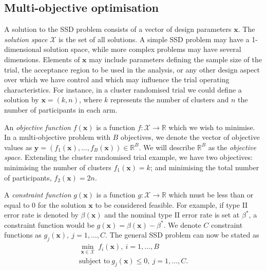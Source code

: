 \documentclass[sagev, Crown]{sagej}
\begin{document}
\subsection{Multi-objective optimisation}\label{sec:optimisation}

A solution to the SSD problem consists of a vector of design parameters $\mathbf{x}$. The \emph{solution space} $\mathcal{X}$ is the set of all solutions. A simple SSD problem may have a 1-dimensional solution space, while more complex problems may have several dimensions. Elements of $\mathbf{x}$ may include parameters defining the sample size of the trial, the acceptance region to be used in the analysis, or any other design aspect over which we have control and which may influence the trial operating characteristics. For instance, in a cluster randomised trial we could define a solution by $\mathbf{x} = (k, n)$, where $k$ represents the number of clusters and $n$ the number of participants in each arm.

An \emph{objective function} $f(\mathbf{x})$ is a function $f : \mathcal{X} \rightarrow \mathbb{R}$ which we wish to minimise. In a multi-objective problem with $B$ objectives, we denote the vector of objective values as $\mathbf{y} = (f_{1}(\mathbf{x}), \ldots, f_{B}(\mathbf{x})) \in \mathbb{R}^{B}$. We will describe $\mathbb{R}^{B}$ as the \emph{objective space}. Extending the cluster randomised trial example, we have two objectives: minimising the number of clusters $f_1(\mathbf{x}) = k$; and minimising the total number of participants, $f_2(\mathbf{x}) = 2n$.

A \emph{constraint function} $g(\mathbf{x})$ is a function $g : \mathcal{X} \rightarrow \mathbb{R}$ which must be less than or equal to 0 for the solution $\mathbf{x}$ to be considered feasible. For example, if type II error rate is denoted by $\beta(\mathbf{x})$ and the nominal type II error rate is set at $\beta^{*}$, a constraint function would be $g(\mathbf{x}) = \beta(\mathbf{x}) - \beta^{*}$. We denote $C$ constraint functions as $g_{j}(\mathbf{x}),~j=1,\ldots , C$. The general SSD problem can now be stated as
\begin{align}
\min_{\mathbf{x} \in \mathcal{X}} {~ f_{i}(\mathbf{x})}, ~ i = 1, \ldots , B \\
\text{subject to} ~ g_{j}(\mathbf{x}) \leq 0, ~ j = 1, \ldots , C.
\end{align}
\end{document}
